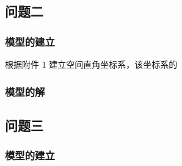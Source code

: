 \documentclass[withoutpreface,bwprint]{cumcmthesis} %
\begin{document}
\subsection{问题二}
\subsubsection{模型的建立}
根据附件 $1$ 建立空间直角坐标系，该坐标系的
\subsubsection{模型的解}
\subsection{问题三}
\subsubsection{模型的建立}
\end{document}
